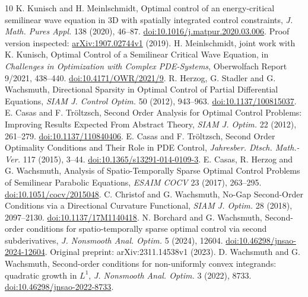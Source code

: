 \documentclass[11pt]{article}
\begin{document}
\begin{thebibliography}{10}
 K. Kunisch and H. Meinlschmidt,
Optimal control of an energy-critical semilinear wave equation in 3D with
spatially integrated control constraints, \emph{J. Math. Pures Appl.}
138 (2020), 46--87. \href{https://doi.org/10.1016/j.matpur.2020.03.006}{doi:10.1016/j.matpur.2020.03.006}.
Proof version inspected: \href{https://arxiv.org/pdf/1907.02744v1}{arXiv:1907.02744v1} (2019).
 H. Meinlschmidt, joint work with K. Kunisch,
Optimal Control of a Semilinear Critical Wave Equation, in
\emph{Challenges in Optimization with Complex PDE-Systems}, Oberwolfach
Report 9/2021, 438--440.
\href{https://doi.org/10.4171/OWR/2021/9}{doi:10.4171/OWR/2021/9}.
 R. Herzog, G. Stadler and G. Wachsmuth,
Directional Sparsity in Optimal Control of Partial Differential Equations,
\emph{SIAM J. Control Optim.} 50 (2012), 943--963.
\href{https://doi.org/10.1137/100815037}{doi:10.1137/100815037}.
 E. Casas and F. Tr\"oltzsch,
Second Order Analysis for Optimal Control Problems: Improving Results
Expected From Abstract Theory, \emph{SIAM J. Optim.} 22 (2012), 261--279.
\href{https://doi.org/10.1137/110840406}{doi:10.1137/110840406}.
 E. Casas and F. Tr\"oltzsch,
Second Order Optimality Conditions and Their Role in PDE Control,
\emph{Jahresber. Dtsch. Math.-Ver.} 117 (2015), 3--44.
\href{https://doi.org/10.1365/s13291-014-0109-3}{doi:10.1365/s13291-014-0109-3}.
 E. Casas, R. Herzog and G. Wachsmuth,
Analysis of Spatio-Temporally Sparse Optimal Control Problems of Semilinear
Parabolic Equations, \emph{ESAIM COCV} 23 (2017), 263--295.
\href{https://doi.org/10.1051/cocv/2015048}{doi:10.1051/cocv/2015048}.
 C. Christof and G. Wachsmuth,
No-Gap Second-Order Conditions via a Directional Curvature Functional,
\emph{SIAM J. Optim.} 28 (2018), 2097--2130.
\href{https://doi.org/10.1137/17M1140418}{doi:10.1137/17M1140418}.
 N. Borchard and G. Wachsmuth,
Second-order conditions for spatio-temporally sparse optimal control via
second subderivatives, \emph{J. Nonsmooth Anal. Optim.} 5 (2024), 12604.
\href{https://doi.org/10.46298/jnsao-2024-12604}{doi:10.46298/jnsao-2024-12604}.
Original preprint: arXiv:2311.14538v1 (2023).
 D. Wachsmuth and G. Wachsmuth,
Second-order conditions for non-uniformly convex integrands: quadratic
growth in $L^1$, \emph{J. Nonsmooth Anal. Optim.} 3 (2022), 8733.
\href{https://doi.org/10.46298/jnsao-2022-8733}{doi:10.46298/jnsao-2022-8733}.
\end{thebibliography}
\end{document}
